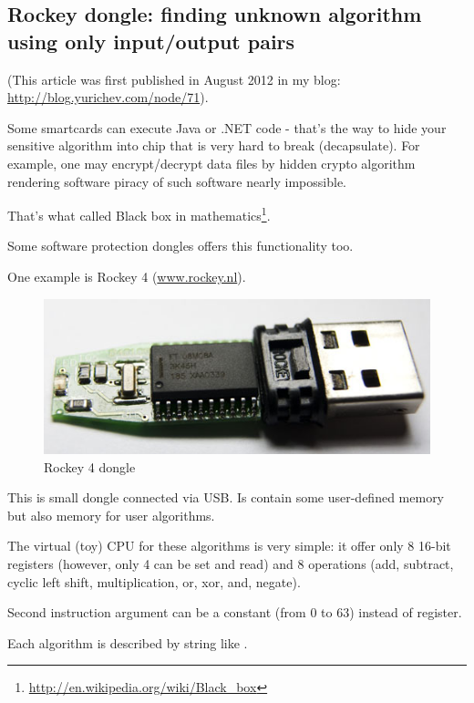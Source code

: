 ﻿\subsection{Rockey dongle: finding unknown algorithm using only input/output pairs}

(This article was first published in August 2012 in my blog: \url{http://blog.yurichev.com/node/71}).

Some smartcards can execute Java or .NET code - that's the way to hide your sensitive algorithm into chip that is very hard to break (decapsulate).
For example, one may encrypt/decrypt data files by hidden crypto algorithm rendering software piracy of such software nearly impossible.

That's what called Black box in mathematics\footnote{\url{http://en.wikipedia.org/wiki/Black\_box}}.

Some software protection dongles offers this functionality too.

One example is Rockey 4 (\href{http://www.rockey.nl/en/rockey.html}{www.rockey.nl}).

\begin{figure}[H]
\centering
\includegraphics[scale=2]{pgm_synth/rockey_4.jpg}
\caption{Rockey 4 dongle}
\end{figure}

This is small dongle connected via USB. Is contain some user-defined memory but also memory for user algorithms.

The virtual (toy) CPU for these algorithms is very simple: it offer only 8 16-bit registers (however, only 4 can be set and read) and 8 operations (add, subtract, cyclic left shift, multiplication, or, xor, and, negate).

Second instruction argument can be a constant (from 0 to 63) instead of register.

Each algorithm is described by string like \colorbox{light-gray}{}.

